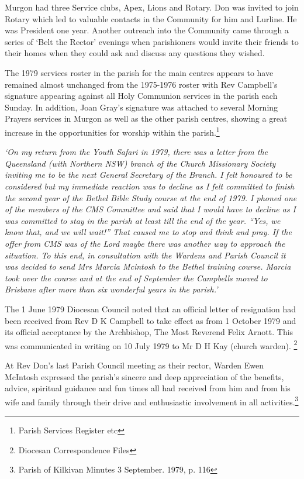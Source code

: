 Murgon had three Service clubs, Apex, Lions and Rotary. Don was invited to join Rotary which led to valuable contacts in the Community for him and Lurline. He was President one year. Another outreach into the Community came through a series of `Belt the Rector' evenings when parishioners would invite their friends to their homes when they could ask and discuss any questions they wished.

The 1979 services roster in the parish for the main centres appears to have remained almost unchanged from the 1975-1976 roster with Rev Campbell's signature appearing against all Holy Communion services in the parish each Sunday. In addition, Joan Gray's signature was attached to several Morning Prayers services in Murgon as well as the other parish centres, showing a great increase in the opportunities for worship within the parish.\footnote{Parish Services Register etc}

\emph{`On my return from the Youth Safari in 1979, there was a letter from the Queensland (with Northern NSW) branch of the Church Missionary Society inviting me to be the next General Secretary of the Branch. I felt honoured to be considered but my immediate reaction was to decline as I felt committed to finish the second year of the Bethel Bible Study course at the end of 1979. I phoned one of the members of the CMS Committee and said that I would have to decline as I was committed to stay in the parish at least till the end of the year. ``Yes, we know that, and we will wait!'' That caused me to stop and think and pray. If the offer from CMS was of the Lord maybe there was another way to approach the situation. To this end, in consultation with the Wardens and Parish Council it was decided to send Mrs Marcia Mcintosh to the Bethel training course. Marcia took over the course and at the end of September the Campbells moved to Brisbane after more than six wonderful years in the parish.'}

The 1 June 1979 Diocesan Council noted that an official letter of resignation had been received from Rev D K Campbell to take effect as from 1 October 1979 and its official acceptance by the Archbishop, The Most Reverend Felix Arnott. This was communicated in writing on 10 July 1979 to Mr D H Kay (church warden). \footnote{Diocesan Correspondence Files}

At Rev Don's last Parish Council meeting as their rector, Warden Ewen McIntosh expressed the parish's sincere and deep appreciation of the benefits, advice, spiritual guidance and fun times all had received from him and from his wife and family through their drive and enthusiastic involvement in all activities.\footnote{Parish of Kilkivan Minutes 3 September. 1979, p. 116}

